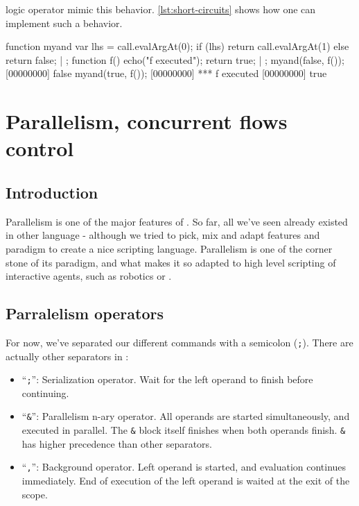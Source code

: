 \urbi logic operator mimic this behavior. \autoref{lst:short-circuits} shows
how one can implement such a behavior.

\begin{urbiscript}[caption=Implementing logic short circuits,
label=lst:short-circuits]
function myand
{
  var lhs = call.evalArgAt(0);
  if (lhs)
    return call.evalArgAt(1)
  else
    return false;
} | {};
function f()
{
  echo("f executed");
  return true;
} | {};
myand(false, f());
[00000000] false
myand(true, f());
[00000000] *** f executed
[00000000] true
\end{urbiscript}


\chapter{Parallelism, concurrent flows control}

\section{Introduction}

Parallelism is one of the major features of \urbi. So far, all we've
seen already existed in other language - although we tried to pick,
mix and adapt features and paradigm to create a nice scripting
language. Parallelism is one of the corner stone of its paradigm, and
what makes it so adapted to high level scripting of interactive
agents, such as robotics or \ai.

\section{Parralelism operators}

For now, we've separated our different commands with a semicolon
(\texttt{;}). There are actually other separators in \urbi:

\begin{itemize}
\item ``\texttt{;}'': Serialization operator. Wait for the left
  operand to finish before continuing.
\item ``\texttt{\&}'': Parallelism n-ary operator. All operands are
  started simultaneously, and executed in parallel. The \texttt{\&}
  block itself finishes when both operands finish. \texttt{\&} has
  higher precedence than other separators.
\item ``\texttt{,}'': Background operator. Left operand is started,
  and evaluation continues immediately. End of execution of the left
  operand is waited at the exit of the scope.
\end{itemize}

